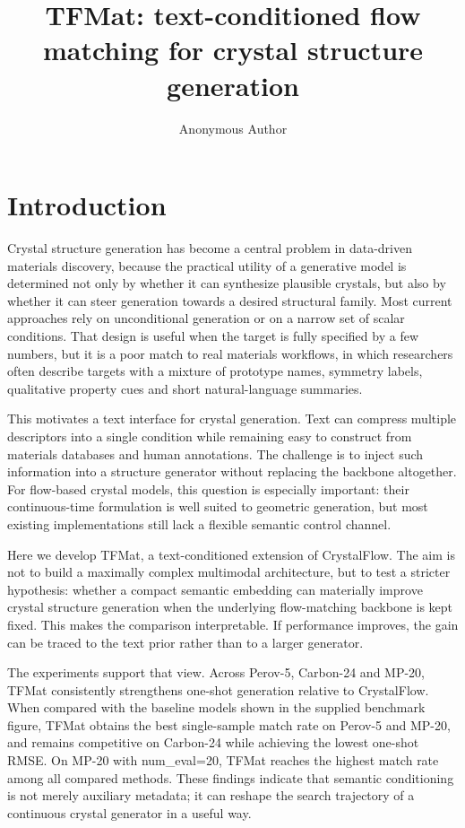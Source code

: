 \documentclass[fleqn,10pt]{wlscirep}
\title{TFMat: text-conditioned flow matching for crystal structure generation}
\author[1,*]{Anonymous Author}
\affil[1]{Affiliation to be added before submission}
\affil[*]{e-mail: to be added at submission}
\begin{document}
\flushbottom
\maketitle
\thispagestyle{empty}

\section*{Introduction}
Crystal structure generation has become a central problem in data-driven materials discovery, because the practical utility of a generative model is determined not only by whether it can synthesize plausible crystals, but also by whether it can steer generation towards a desired structural family. Most current approaches rely on unconditional generation or on a narrow set of scalar conditions. That design is useful when the target is fully specified by a few numbers, but it is a poor match to real materials workflows, in which researchers often describe targets with a mixture of prototype names, symmetry labels, qualitative property cues and short natural-language summaries.

This motivates a text interface for crystal generation. Text can compress multiple descriptors into a single condition while remaining easy to construct from materials databases and human annotations. The challenge is to inject such information into a structure generator without replacing the backbone altogether. For flow-based crystal models, this question is especially important: their continuous-time formulation is well suited to geometric generation, but most existing implementations still lack a flexible semantic control channel.

Here we develop TFMat, a text-conditioned extension of CrystalFlow. The aim is not to build a maximally complex multimodal architecture, but to test a stricter hypothesis: whether a compact semantic embedding can materially improve crystal structure generation when the underlying flow-matching backbone is kept fixed. This makes the comparison interpretable. If performance improves, the gain can be traced to the text prior rather than to a larger generator.

The experiments support that view. Across Perov-5, Carbon-24 and MP-20, TFMat consistently strengthens one-shot generation relative to CrystalFlow. When compared with the baseline models shown in the supplied benchmark figure, TFMat obtains the best single-sample match rate on Perov-5 and MP-20, and remains competitive on Carbon-24 while achieving the lowest one-shot RMSE. On MP-20 with num\_eval=20, TFMat reaches the highest match rate among all compared methods. These findings indicate that semantic conditioning is not merely auxiliary metadata; it can reshape the search trajectory of a continuous crystal generator in a useful way.
\end{document}
